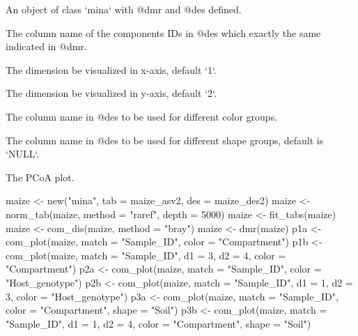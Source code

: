 \documentclass[a4paper]{book}
\begin{document}
%
\begin{Arguments}
\begin{ldescription}
\item[\code{x}] An object of class `mina` with @dmr and @des defined.

\item[\code{match}] The column name of the components IDs in @des which exactly the
same indicated in @dmr.

\item[\code{d1}] The dimension be visualized in x-axis, default `1`.

\item[\code{d2}] The dimension be visualized in y-axis, default `2`.

\item[\code{color}] The column name in @des to be used for different color groups.

\item[\code{shape}] The column name in @des to be used for different shape groups,
default is `NULL`.
\end{ldescription}
\end{Arguments}
%
\begin{Value}
The PCoA plot.
\end{Value}
%
\begin{Examples}
\begin{ExampleCode}
maize <- new("mina", tab = maize_asv2, des = maize_des2)
maize <- norm_tab(maize, method = "raref", depth = 5000)
maize <- fit_tabs(maize)
maize <- com_dis(maize, method = "bray")
maize <- dmr(maize)
p1a <- com_plot(maize, match = "Sample_ID", color = "Compartment")
p1b <- com_plot(maize, match = "Sample_ID", d1 = 3, d2 = 4,
color = "Compartment")
p2a <- com_plot(maize, match = "Sample_ID", color = "Host_genotype")
p2b <- com_plot(maize, match = "Sample_ID", d1 = 1, d2 = 3, color =
"Host_genotype")
p3a <- com_plot(maize, match = "Sample_ID", color = "Compartment", shape =
"Soil")
p3b <- com_plot(maize, match = "Sample_ID", d1 = 1, d2 = 4, color =
"Compartment", shape = "Soil")
\end{ExampleCode}
\end{Examples}
\end{document}
